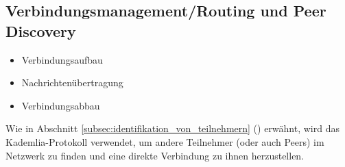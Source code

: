 \subsection{Verbindungsmanagement/Routing und Peer Discovery}
\label{subsec:routing}

\begin{itemize}
    \item Verbindungsaufbau
    \item Nachrichtenübertragung
    \item Verbindungsabbau
\end{itemize}

Wie in Abschnitt \ref{subsec:identifikation_von_teilnehmern} () erwähnt, wird das Kademlia-Protokoll verwendet, um andere Teilnehmer (oder auch Peers) im Netzwerk zu finden und eine direkte Verbindung zu ihnen herzustellen.


